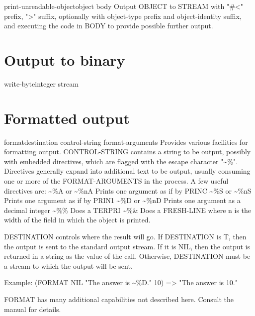 \documentclass[10pt,english]{book}
\begin{document}
\begin{macro}{print-unreadable-object}{object \body body}
  Output OBJECT to STREAM with "\#<" prefix, ">" suffix, optionally
  with object-type prefix and object-identity suffix, and executing the
  code in BODY to provide possible further output.
\end{macro}

\section{Output to binary}
\label{sec:output-binary}

\begin{function}{write-byte}{integer stream}
  
\end{function}

\section{Formatted output}
\label{sec:formatted-output}

\begin{function}{format}{destination control-string \rest format-arguments}
  Provides various facilities for formatting output.
  CONTROL-STRING contains a string to be output, possibly with embedded
  directives, which are flagged with the escape character "\~{}\%". Directives
  generally expand into additional text to be output, usually consuming one
  or more of the FORMAT-ARGUMENTS in the process. A few useful directives
  are:
        \~{}\%A or \~{}\%nA   Prints one argument as if by PRINC
        \~{}\%S or \~{}\%nS   Prints one argument as if by PRIN1
        \~{}\%D or \~{}\%nD   Prints one argument as a decimal integer
        \~{}\%\%          Does a TERPRI
        \~{}\%\&          Does a FRESH-LINE
  where n is the width of the field in which the object is printed.

  DESTINATION controls where the result will go. If DESTINATION is T, then
  the output is sent to the standard output stream. If it is NIL, then the
  output is returned in a string as the value of the call. Otherwise,
  DESTINATION must be a stream to which the output will be sent.

  Example:   (FORMAT NIL "The answer is \~{}\%D." 10) => "The answer is 10."

  FORMAT has many additional capabilities not described here. Consult the
  manual for details.
\end{function}
\end{document}
